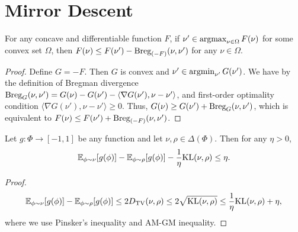 \newpage
\section{Mirror Descent}

\begin{lemma}\label{lem: bregman}
   For any concave and differentiable function $F$, if $\nu'\in\operatorname*{argmax}_{\nu\in\Omega} F(\nu)$ for some convex set $\Omega$, then $F(\nu)\leq F(\nu') - \textup{Breg}_{(-F)}(\nu, \nu')$ for any $\nu\in\Omega$. 
\end{lemma}
\begin{proof}
Define $G = -F$. Then $G$ is convex and $\nu'\in\operatorname*{argmin}_{\nu'} G(\nu')$. We have by the definition of Bregman divergence $\textup{Breg}_G(\nu, \nu')= G(\nu) - G(\nu') - \langle \nabla G(\nu'), \nu-\nu'\rangle$, and first-order optimality condition $\langle \nabla G(\nu'), \nu-\nu'\rangle \ge 0$. Thus, $G(\nu) \ge G(\nu') + \textup{Breg}_G(\nu, \nu')$, which is equivalent to $F(\nu) \le F(\nu') + \textup{Breg}_{(-F)}(\nu, \nu')$.
\end{proof}

\begin{lemma}\label{lem:stability}
    Let $g: \Phi\to [-1,1]$ be any function and let $\nu, \rho\in\Delta(\Phi)$. Then for any $\eta>0$, 
    \begin{align*}
        \mathbb{E}_{\phi\sim \nu}[g(\phi)] - \mathbb{E}_{\phi\sim \rho}[g(\phi)] - \frac{1}{\eta} \text{KL}(\nu, \rho) \leq \eta. 
    \end{align*}
\end{lemma}
\begin{proof}
    \begin{align*}
        \mathbb{E}_{\phi\sim \nu}[g(\phi)] - \mathbb{E}_{\phi\sim \rho}[g(\phi)] \leq 2D_{\text{TV}}(\nu, \rho) \leq 2\sqrt{\text{KL}(\nu, \rho)}\leq \frac{1}{\eta}\text{KL}(\nu, \rho) + \eta, 
    \end{align*}
    where we use Pinsker's inequality and AM-GM inequality. 
\end{proof}


